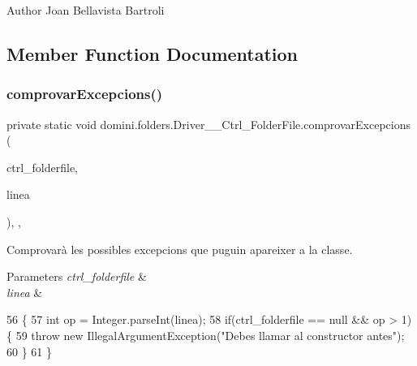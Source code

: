 \begin{DoxyAuthor}{Author}
Joan Bellavista Bartroli 
\end{DoxyAuthor}


\subsection{Member Function Documentation}
\mbox{\label{classdomini_1_1folders_1_1Driver____Ctrl__FolderFile_add85c568af9cc21b5b4dc8c413b8d565}} 
\subsubsection{\texorpdfstring{comprovar\+Excepcions()}{comprovarExcepcions()}}
{\footnotesize\ttfamily private static void domini.\+folders.\+Driver\+\_\+\+\_\+\+Ctrl\+\_\+\+Folder\+File.\+comprovar\+Excepcions (\begin{DoxyParamCaption}\item[{\hyperlink{classdomini_1_1folders_1_1Ctrl__FolderFile}{Ctrl\+\_\+\+Folder\+File}}]{ctrl\+\_\+folderfile,  }\item[{String}]{linea }\end{DoxyParamCaption})\hspace{0.3cm}{\ttfamily [inline]}, {\ttfamily [static]}, {\ttfamily [private]}}



Comprovarà les possibles excepcions que puguin apareixer a la classe. 


\begin{DoxyParams}{Parameters}
{\em ctrl\+\_\+folderfile} & \\
\hline
{\em linea} & \\
\hline
\end{DoxyParams}

\begin{DoxyCode}
56                                                                                           \{
57         \textcolor{keywordtype}{int} op = Integer.parseInt(linea);
58         \textcolor{keywordflow}{if}(ctrl\_folderfile == null && op > 1) \{
59             \textcolor{keywordflow}{throw} \textcolor{keyword}{new} IllegalArgumentException(\textcolor{stringliteral}{"Debes llamar al constructor antes"});
60         \}
61     \}
\end{DoxyCode}
\mbox{\label{classdomini_1_1folders_1_1Driver____Ctrl__FolderFile_abc98f0085a68ed640e01816cd9a389ef}} 
